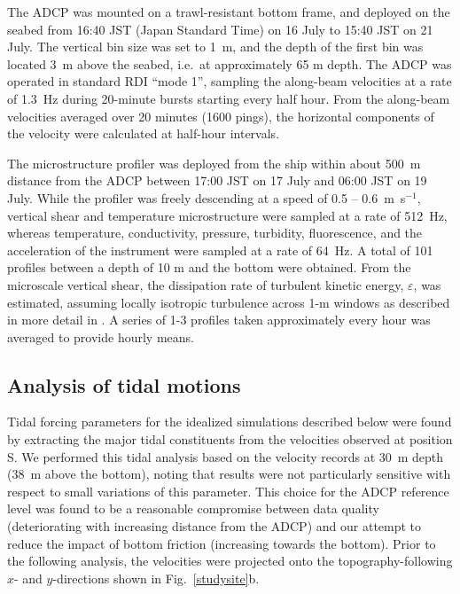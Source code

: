 The ADCP was mounted on a trawl-resistant bottom frame, and deployed
on the seabed from 16:40 JST (Japan Standard Time) on 16 July to 15:40
JST on 21 July. The vertical bin size was set to 1~m, and the depth of
the first bin was located 3~m above the seabed, i.e.\ at approximately
65 m depth. The ADCP was operated in standard RDI ``mode 1'', sampling
the along-beam velocities at a rate of 1.3~Hz during 20-minute bursts
starting every half hour. From the along-beam velocities averaged over
20 minutes (1600 pings), the horizontal components of the velocity were 
calculated at half-hour intervals.

The microstructure profiler was deployed from the ship within about
500~m distance from the ADCP between 17:00 JST on 17 July and 06:00
JST on 19 July. While the profiler was freely descending at a speed of
0.5 -- 0.6~m~s$^{-1}$, vertical shear and temperature microstructure
were sampled at a rate of 512~Hz, whereas temperature, conductivity,
pressure, turbidity, fluorescence, and the acceleration of the
instrument were sampled at a rate of 64~Hz. A total of 101 profiles
between a depth of 10 m and the bottom were obtained. From the
microscale vertical shear, the dissipation rate of turbulent kinetic
energy, $\varepsilon$, was estimated, assuming locally isotropic
turbulence \citep[][]{Hinze1987} across 1-m windows as described in
more detail in \cite{Endohetal2016a}. A series of 1-3 profiles taken
approximately every hour was averaged to provide hourly means.

\subsection{Analysis of tidal motions}

Tidal forcing parameters for the idealized simulations described below
were found by extracting the major tidal constituents from the
velocities observed at position S. We performed this tidal analysis
based on the velocity records at 30~m depth (38~m above the bottom),
noting that results were not particularly sensitive with respect to
small variations of this parameter. This choice for the ADCP reference
level was found to be a reasonable compromise between data quality
(deteriorating with increasing distance from the ADCP) and our attempt
to reduce the impact of bottom friction (increasing towards the
bottom). Prior to the following analysis, the velocities were
projected onto the topography-following $x$- and $y$-directions shown
in Fig.\ \ref{studysite}b.

